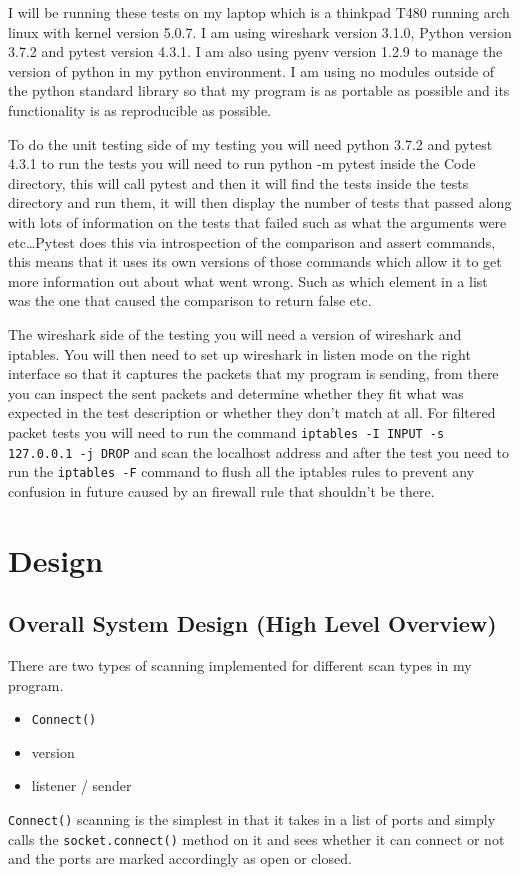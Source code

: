 \documentclass[titlepage]{article}
\let\Oldsection\section{}
\renewcommand{\section}{\FloatBarrier\Oldsection}
\let\Oldsubsection\subsection{}
\renewcommand{\subsection}{\FloatBarrier\Oldsubsection}
\begin{document}
I will be running these tests on my laptop which is a thinkpad T480 running arch linux
with kernel version 5.0.7. I am using wireshark version 3.1.0, Python version 3.7.2 and
pytest version 4.3.1. I am also using pyenv version 1.2.9 to manage the version of python in
my python environment. I am using no modules outside of the python standard library so that
my program is as portable as possible and its functionality is as reproducible as possible.

To do the unit testing side of my testing you will need python 3.7.2 and pytest 4.3.1
to run the tests you will need to run python -m pytest inside the Code directory, this will
call pytest and then it will find the tests inside the tests directory and run them, it
will then display the number of tests that passed along with lots of information on the
tests that failed such as what the arguments were etc\ldots Pytest does this via introspection
of the comparison and assert commands, this means that it uses its own versions of those commands
which allow it to get more information out about what went wrong. Such as which element in a list
was the one that caused the comparison to return false etc.

The wireshark side of the testing you will need a version of wireshark and iptables.
You will then need to set up wireshark in listen mode on the right interface so that it
captures the packets that my program is sending, from there you can inspect the sent packets and
determine whether they fit what was expected in the test description or whether they don't match at
all. For filtered packet tests you will need to run the command \verb|iptables -I INPUT -s 127.0.0.1 -j DROP|
and scan the localhost address and after the test you need to run the \verb|iptables -F| command
to flush all the iptables rules to prevent any confusion in future caused by an firewall rule
that shouldn't be there.

\section{Design}

\subsection{Overall System Design (High Level Overview)}

There are two types of scanning implemented for different scan types in my program.
\begin{itemize}
  \item{\verb|Connect()|}
  \item{version}
  \item{listener / sender}
\end{itemize}
\verb|Connect()| scanning is the simplest in that it takes in a list of \glspl{port} and simply 
calls the \verb|socket.connect()| method on it and sees whether it can connect or not and the 
\glspl{port} are marked accordingly as open or closed. 
\end{document}
